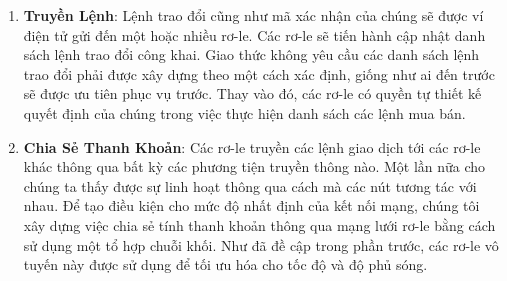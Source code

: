 \documentclass{article}
\makeatletter
\newenvironment{figurehere}
 {\def\@captype{figure}}
 {}
\makeatother
\begin{document}
\begin{multicols}{2}
\begin{enumerate}
\begin{center}
\begin{figurehere}

\caption{Quy trình trao đổi Loopring}
\label{fig:process}
\end{figurehere}
\end{center}


\item \textbf{Truyền Lệnh}: Lệnh trao đổi cũng như mã xác nhận của chúng sẽ được ví điện tử gửi đến một hoặc nhiều rơ-le. Các rơ-le sẽ tiến hành cập nhật danh sách lệnh trao đổi công khai. Giao thức không yêu cầu các danh sách lệnh trao đổi phải được xây dựng theo một cách xác định, giống như ai đến trước sẽ được ưu tiên phục vụ trước. Thay vào đó, các rơ-le có quyền tự thiết kế quyết định của chúng trong việc thực hiện danh sách các lệnh mua bán.

\item \textbf{Chia Sẻ Thanh Khoản}: Các rơ-le truyền các lệnh giao dịch tới các rơ-le khác thông qua bất kỳ các phương tiện truyền thông nào. Một lần nữa cho chúng ta thấy được sự linh hoạt thông qua cách mà các nút tương tác với nhau. Để tạo điều kiện cho mức độ nhất định của kết nối mạng, chúng tôi xây dựng việc chia sẻ tính thanh khoản thông qua mạng lưới rơ-le bằng cách sử dụng một tổ hợp chuỗi khối. Như đã đề cập trong phần trước, các rơ-le vô tuyến này được sử dụng để tối ưu hóa cho tốc độ và độ phủ sóng.


\end{enumerate}
\end{multicols}
\end{document}
